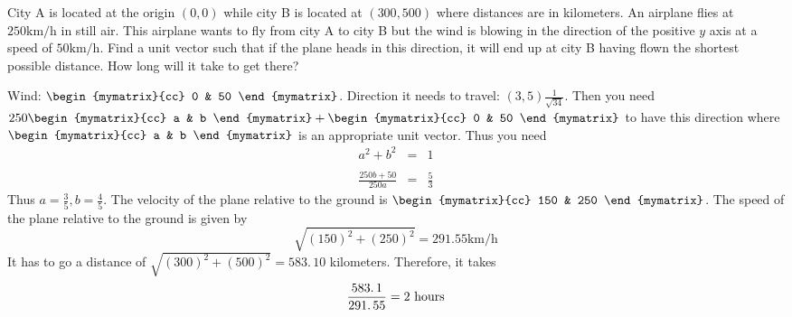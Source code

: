 \begin{ex} 
City A is located at the origin $(0,0)$ while city B is located at $(300,500) $ where distances are in kilometers. An airplane flies at $250\textrm{km}/\textrm{h}$ in still air. This airplane wants to fly from city A to city
B but the wind is blowing in the direction of the positive $y$ axis at a
speed of $50\textrm{km}/\textrm{h}$. Find a unit vector such that if the plane heads
in this direction, it will end up at city B having flown the shortest
possible distance. How long will it take to get there? \vspace{1mm}
\begin{sol}
Wind: $\begin{mymatrix}{cc}
0 & 50
\end{mymatrix}$. Direction it needs to travel: $(3,5) \frac{1}{\sqrt{34}}$. Then you need $250 \begin{mymatrix}{cc}
 a & b
\end{mymatrix} + \begin{mymatrix}{cc}
0 & 50
\end{mymatrix} $ to
have this direction where $\begin{mymatrix}{cc}
 a & b
\end{mymatrix} $ is an appropriate unit
vector. Thus you need
\begin{eqnarray*}
a^{2}+b^{2} &=&1 \\ 
& & \\
\frac{250b+50}{250a} &=&\frac{5}{3}
\end{eqnarray*}
Thus $a=\frac{3}{5},b=\frac{4}{5}$. The velocity of the plane relative
to the ground is $\begin{mymatrix}{cc}
150 & 250
\end{mymatrix}$. The speed of the plane relative to the ground is given by 
\[
\sqrt{(150) ^{2}+(250) ^{2}}=
291.55 \textrm{km}/\textrm{h}
\]
It has to go a distance of $\sqrt{(300) ^{2}+(500)
^{2}}=\allowbreak 583.\,\allowbreak 10$ kilometers. Therefore, it takes
\[
\frac{\allowbreak 583.\,\allowbreak 1}{\allowbreak 291.\,\allowbreak 55}=2
\text{ hours}
\]
\end{sol}
\end{ex}

